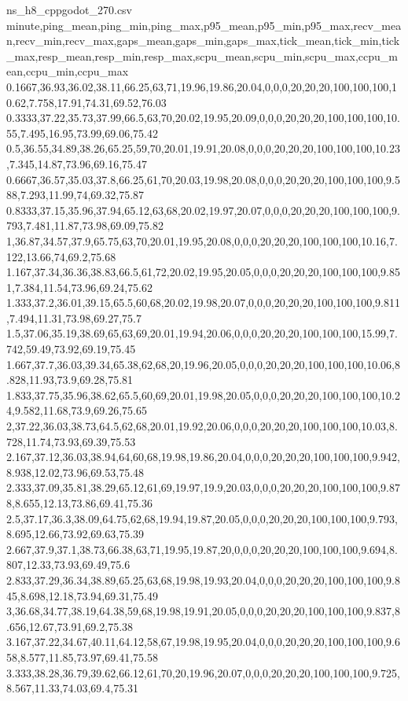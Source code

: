 \begin{filecontents*}[overwrite]{ns_h8_cppgodot_270.csv}
minute,ping_mean,ping_min,ping_max,p95_mean,p95_min,p95_max,recv_mean,recv_min,recv_max,gaps_mean,gaps_min,gaps_max,tick_mean,tick_min,tick_max,resp_mean,resp_min,resp_max,scpu_mean,scpu_min,scpu_max,ccpu_mean,ccpu_min,ccpu_max
0.1667,36.93,36.02,38.11,66.25,63,71,19.96,19.86,20.04,0,0,0,20,20,20,100,100,100,10.62,7.758,17.91,74.31,69.52,76.03
0.3333,37.22,35.73,37.99,66.5,63,70,20.02,19.95,20.09,0,0,0,20,20,20,100,100,100,10.55,7.495,16.95,73.99,69.06,75.42
0.5,36.55,34.89,38.26,65.25,59,70,20.01,19.91,20.08,0,0,0,20,20,20,100,100,100,10.23,7.345,14.87,73.96,69.16,75.47
0.6667,36.57,35.03,37.8,66.25,61,70,20.03,19.98,20.08,0,0,0,20,20,20,100,100,100,9.588,7.293,11.99,74,69.32,75.87
0.8333,37.15,35.96,37.94,65.12,63,68,20.02,19.97,20.07,0,0,0,20,20,20,100,100,100,9.793,7.481,11.87,73.98,69.09,75.82
1,36.87,34.57,37.9,65.75,63,70,20.01,19.95,20.08,0,0,0,20,20,20,100,100,100,10.16,7.122,13.66,74,69.2,75.68
1.167,37.34,36.36,38.83,66.5,61,72,20.02,19.95,20.05,0,0,0,20,20,20,100,100,100,9.851,7.384,11.54,73.96,69.24,75.62
1.333,37.2,36.01,39.15,65.5,60,68,20.02,19.98,20.07,0,0,0,20,20,20,100,100,100,9.811,7.494,11.31,73.98,69.27,75.7
1.5,37.06,35.19,38.69,65,63,69,20.01,19.94,20.06,0,0,0,20,20,20,100,100,100,15.99,7.742,59.49,73.92,69.19,75.45
1.667,37.7,36.03,39.34,65.38,62,68,20,19.96,20.05,0,0,0,20,20,20,100,100,100,10.06,8.828,11.93,73.9,69.28,75.81
1.833,37.75,35.96,38.62,65.5,60,69,20.01,19.98,20.05,0,0,0,20,20,20,100,100,100,10.24,9.582,11.68,73.9,69.26,75.65
2,37.22,36.03,38.73,64.5,62,68,20.01,19.92,20.06,0,0,0,20,20,20,100,100,100,10.03,8.728,11.74,73.93,69.39,75.53
2.167,37.12,36.03,38.94,64,60,68,19.98,19.86,20.04,0,0,0,20,20,20,100,100,100,9.942,8.938,12.02,73.96,69.53,75.48
2.333,37.09,35.81,38.29,65.12,61,69,19.97,19.9,20.03,0,0,0,20,20,20,100,100,100,9.878,8.655,12.13,73.86,69.41,75.36
2.5,37.17,36.3,38.09,64.75,62,68,19.94,19.87,20.05,0,0,0,20,20,20,100,100,100,9.793,8.695,12.66,73.92,69.63,75.39
2.667,37.9,37.1,38.73,66.38,63,71,19.95,19.87,20,0,0,0,20,20,20,100,100,100,9.694,8.807,12.33,73.93,69.49,75.6
2.833,37.29,36.34,38.89,65.25,63,68,19.98,19.93,20.04,0,0,0,20,20,20,100,100,100,9.845,8.698,12.18,73.94,69.31,75.49
3,36.68,34.77,38.19,64.38,59,68,19.98,19.91,20.05,0,0,0,20,20,20,100,100,100,9.837,8.656,12.67,73.91,69.2,75.38
3.167,37.22,34.67,40.11,64.12,58,67,19.98,19.95,20.04,0,0,0,20,20,20,100,100,100,9.658,8.577,11.85,73.97,69.41,75.58
3.333,38.28,36.79,39.62,66.12,61,70,20,19.96,20.07,0,0,0,20,20,20,100,100,100,9.725,8.567,11.33,74.03,69.4,75.31

\end{filecontents*}
